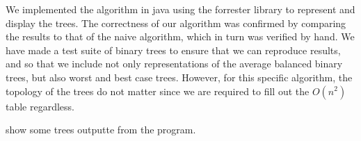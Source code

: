We implemented the algorithm in java using the forrester \cite{?} library to represent and display the trees. The correctness of our algorithm was confirmed by comparing the results to that of the naive algorithm, which in turn was verified by hand. We have made a test suite of binary trees to ensure that we can reproduce results, and so that we include not only representations of the average balanced binary trees, but also worst and best case trees. However, for this specific algorithm, the topology of the trees do not matter since we are required to fill out the $O(n^2)$ table regardless.\\
 
show some trees outputte from the program. 

\todo{\dots}